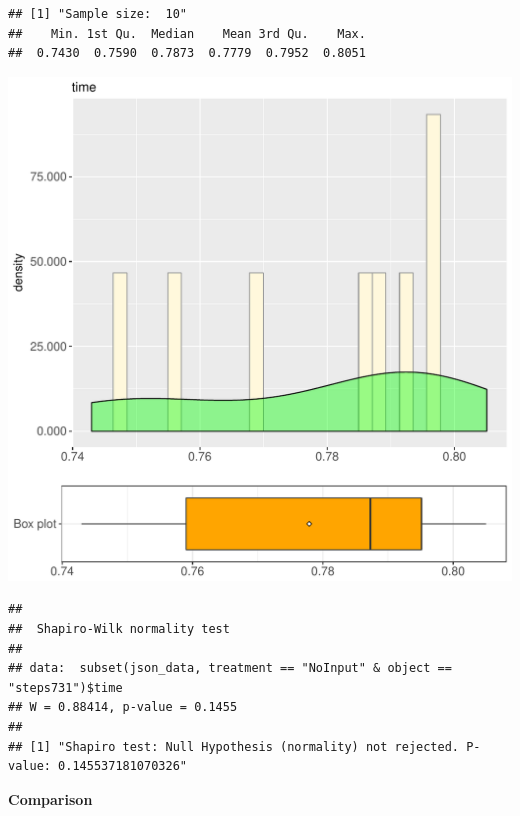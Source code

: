\documentclass{article}\usepackage[]{graphicx}\usepackage[]{color}
\makeatletter
\def\maxwidth{ %
  \ifdim\Gin@nat@width>\linewidth
    \linewidth
  \else
    \Gin@nat@width
  \fi
}
\newenvironment{kframe}{%
 \def\at@end@of@kframe{}%
 \ifinner\ifhmode%
  \def\at@end@of@kframe{\end{minipage}}%
  \begin{minipage}{\columnwidth}%
 \fi\fi%
 \def\FrameCommand##1{\hskip\@totalleftmargin \hskip-\fboxsep
 \colorbox{shadecolor}{##1}\hskip-\fboxsep
     \hskip-\linewidth \hskip-\@totalleftmargin \hskip\columnwidth}%
 \MakeFramed {\advance\hsize-\width
   \@totalleftmargin\z@ \linewidth\hsize
   \@setminipage}}%
 {\par\unskip\endMakeFramed%
 \at@end@of@kframe}
\newenvironment{knitrout}{}{} %
\makeatother
\begin{document}
\begin{knitrout}
\color{fgcolor}\begin{kframe}
\begin{verbatim}
## [1] "Sample size:  10"
##    Min. 1st Qu.  Median    Mean 3rd Qu.    Max. 
##  0.7430  0.7590  0.7873  0.7779  0.7952  0.8051
\end{verbatim}
\end{kframe}
\includegraphics[width=\maxwidth]{figure/RH4_NoInput_steps731-1} 
\begin{kframe}\begin{verbatim}
## 
## 	Shapiro-Wilk normality test
## 
## data:  subset(json_data, treatment == "NoInput" & object == "steps731")$time
## W = 0.88414, p-value = 0.1455
## 
## [1] "Shapiro test: Null Hypothesis (normality) not rejected. P-value: 0.145537181070326"
\end{verbatim}
\end{kframe}
\end{knitrout}
  
 \textbf{Comparison}
  
\end{document}
